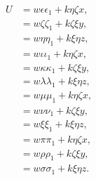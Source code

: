 \documentclass[11pt,a4paper]{book}
\begin{document}
\newpage

\setcounter{page}{450}

\begin{align*}
U &= w\epsilon\epsilon_{1} + k\eta\zeta x, \\
&= w\zeta\zeta_{1} + k\zeta\xi y, \\
&= w\eta\eta_{1} + k\xi\eta z, \\
&= w\iota\iota_{1} + k\eta\zeta x, \\
&= w\kappa\kappa_{1} + k\zeta\xi y, \\
&= w\lambda\lambda_{1} + k\xi\eta z, \\
&= w\mu\mu_{1} + k\eta\zeta x, \\
&= w\nu\nu_{1} + k\zeta\xi y, \\
&= w\xi\xi_{1} + k\xi\eta z, \\
&= w\pi\pi_{1} + k\eta\zeta x, \\
&= w\rho\rho_{1} + k\zeta\xi y, \\
&= w\sigma\sigma_{1} + k\xi\eta z.
\end{align*}
\end{document}
